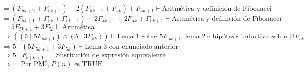 \documentclass{article}
\begin{document}
$  = (F_{5k+2} + F_{5k+1}) + 2(F_{5k+1} + F_{5k}) +F_{5k+1}\vdash 
    \text{Aritm\'etica y definici\'on de Fibonacci} $ \\
$  = (F_{5k+1} +F_{5k}+ F_{5k+1}) + 2F_{5k+1} + 2F_{5k}
     +F_{5k+1}\vdash \text{Aritm\'etica y definici\'on de Fibonacci} $ \\
$  = 5F_{5k+1} + 3F_{5k} \vdash\text{Aritm\'etica} $  \\
$ \Rightarrow ((5 \mid 5F_{5k+1}) \wedge (5 \mid 3F_{5k})) \vdash\text{Lema 1
sobre $5F_{5k+1}$, lema 2 e hip\'otesis inductiva sobre $\mid 3F_{5k}$ } $ \\
$ \Rightarrow 5 \mid (5F_{5k+1} + 3F_{5k}) \vdash \text{Lema 3 con
enunciado anterior} $\\
$ \Rightarrow 5 \mid F_{5(k+1)} \vdash \text{Sustituci\'on de expresi\'on
equivalente} $\\
$ \Rightarrow  \vdash \text{Por PMI, $P(n)$ es TRUE} $\\
\end{document}

